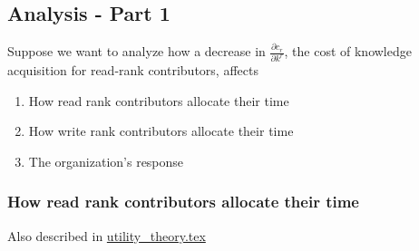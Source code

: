 \documentclass[source/paper/main.tex]{subfiles}
\begin{document}
\subsection{Analysis - Part 1}
Suppose we want to analyze how a decrease in $\frac{\partial c_r}{\partial k^r}$, the cost of knowledge acquisition for read-rank contributors, affects
\begin{enumerate}
    \item How read rank contributors allocate their time
    \item How write rank contributors allocate their time
    \item The organization's response
\end{enumerate}
\subsubsection{How read rank contributors allocate their time}

Also described in \href{run:source/paper/utility_theory.tex}{utility\_theory.tex}
\end{document}
